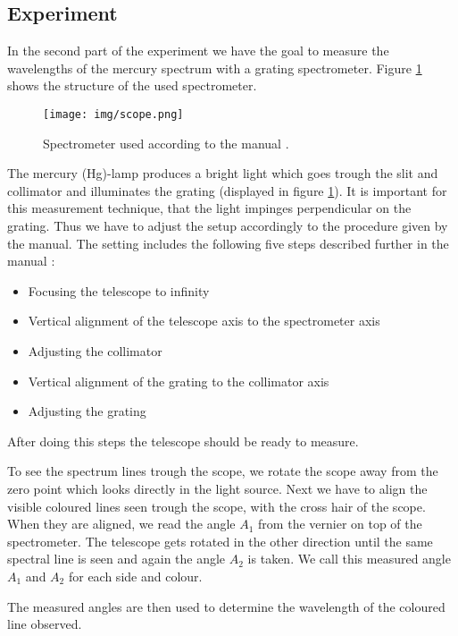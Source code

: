 \subsection{Experiment}
In the second part of the experiment we have the goal to measure the wavelengths of the mercury spectrum with a grating spectrometer.
Figure \ref{fig::scope} shows the structure of the used spectrometer. 
\begin{figure} [ht]
	\centering
	\texttt{[image: img/scope.png]}
	\caption{Spectrometer used according to the manual \cite{manual}.}
	\label{fig::scope}
\end{figure}

The mercury (Hg)-lamp produces a bright light which goes trough the slit and collimator and illuminates the grating (displayed in figure \ref{fig::scope}).
It is important for this measurement technique, that the light impinges perpendicular on the grating.
Thus we have to adjust the setup accordingly to the procedure given by the manual\cite{manual}.
The setting includes the following five steps described further in the manual \cite{manual}:
\begin{itemize}
	\item Focusing the telescope to infinity
	\item Vertical alignment of the telescope axis to the spectrometer axis
	\item Adjusting the collimator
	\item Vertical alignment of the grating to the collimator axis
	\item Adjusting the grating
\end{itemize}
After doing this steps the telescope should be ready to measure.

To see the spectrum lines trough the scope, we rotate the scope away from the zero point which looks directly in the light source.
Next we have to align the visible coloured lines seen trough the scope, with the cross hair of the scope.
When they are aligned, we read the angle $A_1$ from the vernier on top of the spectrometer.
The telescope gets rotated in the other direction until the same spectral line is seen and again the angle $A_2$ is taken.
We call this measured angle $A_1$ and $A_2$ for each side and colour.


The measured angles are then used to determine the wavelength of the coloured line observed.
 